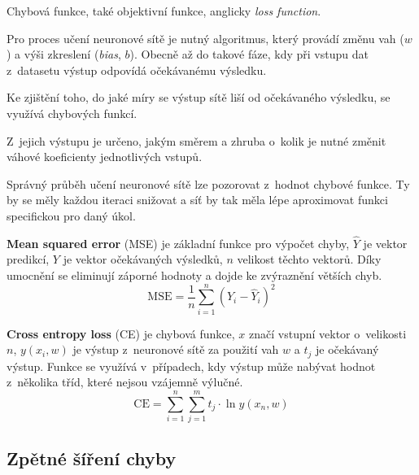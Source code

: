 \begin{compactitem}
    \item Chybová funkce, také objektivní funkce, anglicky \textit{loss function}.

    \item Pro proces učení neuronové sítě je nutný algoritmus, který provádí změnu vah ($w$) a výši zkreslení (\textit{bias}, $b$). Obecně až do takové fáze, kdy při vstupu dat z~datasetu výstup odpovídá očekávanému výsledku.

    \item Ke zjištění toho, do jaké míry se výstup sítě liší od očekávaného výsledku, se využívá chybových funkcí.

    \item Z~jejich výstupu je určeno, jakým směrem a zhruba o~kolik je nutné změnit váhové koeficienty jednotlivých vstupů.

    \item Správný průběh učení neuronové sítě lze pozorovat z~hodnot chybové funkce. Ty by se měly každou iteraci snižovat a síť by tak měla lépe aproximovat funkci specifickou pro daný úkol.

    \item \textbf{Mean squared error} (MSE) je základní funkce pro výpočet chyby, $\hat{Y}$ je vektor predikcí, $Y$ je vektor očekávaných výsledků, $n$ velikost těchto vektorů. Díky umocnění se eliminují záporné hodnoty a dojde ke zvýraznění větších chyb.
    \begin{equation}
        \mathrm{MSE}=\frac{1}{n} \sum_{i = 1}^{n} (Y_i - \hat{Y}_i)^2
        \label{eq_mse}
    \end{equation}

    \item \textbf{Cross entropy loss} (CE) je chybová funkce, $x$ značí vstupní vektor o~velikosti $n$, $y(x_i, w)$ je výstup z~neuronové sítě za použití vah $w$ a $t_j$ je očekávaný výstup. Funkce se využívá v~případech, kdy výstup může nabývat hodnot z~několika tříd, které nejsou vzájemně výlučné.
    \begin{equation}
        \mathrm{CE}=\sum_{i = 1}^{n} \sum_{j = 1}^{m} t_{j} \cdot \ln{y(x_n, w)}
        \label{eq_ce}
    \end{equation}
\end{compactitem}

\subsection{Zpětné šíření chyby}


